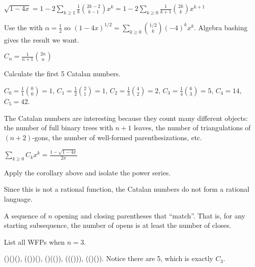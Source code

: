 \documentclass[class=math239,notes,tikz]{agony}
\begin{document}
\begin{corollary}
  $\sqrt{1-4x} = 1-2\sum_{k\geq 1}\frac{1}{k}\binom{2k-2}{k-1}x^k
    = 1-2\sum_{k\geq0}\frac{1}{k+1}\binom{2k}{k}x^{k+1}$
\end{corollary}
\begin{prf}
  Use the  with $\alpha = \frac12$
  so $(1-4x)^{1/2} = \sum_{k \geq 0}\binom{1/2}{k}(-4)^k x^k$.
  Algebra bashing gives the result we want.
\end{prf}

\begin{defn}
  $C_n = \frac{1}{n+1}\binom{2n}{n}$
\end{defn}

\begin{example}
  Calculate the first 5 Catalan numbers.
\end{example}
\begin{sol}
  $C_0 = \frac{1}{1}\binom{0}{0} = 1$,
  $C_1 = \frac{1}{2}\binom{2}{1} = 1$,
  $C_2 = \frac{1}{3}\binom{4}{2} = 2$,
  $C_3 = \frac{1}{4}\binom{6}{3} = 5$,
  $C_4 = 14$, $C_5 = 42$.
\end{sol}

The Catalan numbers are interesting because they count many different objects:
the number of full binary trees with $n+1$ leaves,
the number of triangulations of $(n+2)$-gons,
the number of well-formed parenthesizations,
etc.

\begin{prop}
  $\sum_{k \geq 0} C_k x^k = \frac{1-\sqrt{1-4x}}{2x}$
\end{prop}
\begin{prf}
  Apply the corollary above and isolate the power series.
\end{prf}

Since this is not a rational function, the Catalan numbers do not form a rational language.

\begin{defn}
  A sequence of $n$ opening and closing parentheses that ``match''.
  That is, for any starting subsequence, the number of opens
  is at least the number of closes.
\end{defn}
\begin{example}
  List all WFPs when $n=3$.
\end{example}
\begin{sol}
  ()()(), (())(), ()(()), ((())), (()()).
  Notice there are 5, which is exactly $C_3$.
\end{sol}
\end{document}
